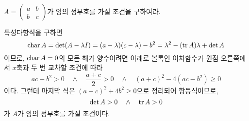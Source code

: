\documentclass[sections/engineering_mathematics_lecture_note.tex]{subfiles}
\begin{document}
\begin{example}
    $A = \begin{pmatrix}a & b\\b & c\end{pmatrix}$가 양의 정부호를 가질 조건을 구하여라.
    \begin{solution}
        특성다항식을 구하면
        \begin{equation*}
            \operatorname{char} A = \det(A - \lambda I) = (a - \lambda)(c - \lambda) - b^2 = \lambda^2 - (\tr A) \lambda + \det A
        \end{equation*}
        이므로, $\operatorname{char} A = 0$의 모든 해가 양수이려면 아래로 볼록인 이차함수가 원점 오른쪽에서 $x$축과 두 번 교차할 조건에 따라
        \begin{equation*}
            ac - b^2 > 0 \quad \wedge \quad \frac{a + c}{2} > 0 \quad \wedge \quad (a + c)^2 - 4(ac - b^2) \geq 0
        \end{equation*}
        이다.
        그런데 마지막 식은 $(a - c)^2 + 4b^2 \geq 0$으로 정리되어 항등식이므로,
        \begin{equation*}
            \det A > 0 \quad \wedge \quad \tr A > 0
        \end{equation*}
        가 $A$가 양의 정부호를 가질 조건이다.
    \end{solution}
\end{example}
\end{document}
